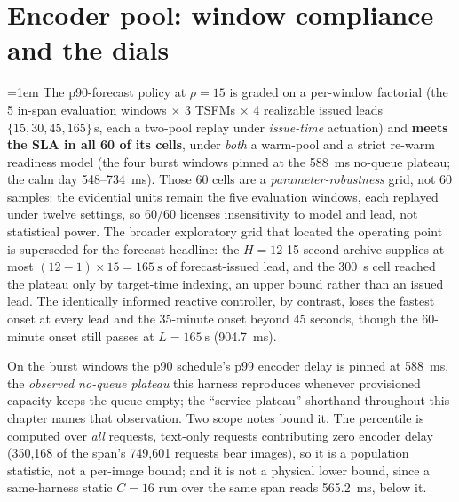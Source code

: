 \section{Encoder pool: window compliance and the dials}
\label{sec:cl-matrix}

{\emergencystretch=1em
The p90-forecast policy at $\rho{=}15$ is graded on a per-window factorial
(the 5 in-span evaluation windows $\times$ 3 TSFMs $\times$ 4 realizable issued
leads $\{15,30,45,165\}$\,s, each a two-pool replay under \emph{issue-time}
actuation) and \textbf{meets the SLA in all 60 of its cells}, under
\emph{both} a warm-pool and a strict re-warm readiness model (the four burst
windows pinned at the \SI{588}{\milli\second} no-queue plateau; the calm day
548--\SI{734}{\milli\second}). Those 60 cells are a
\emph{parameter-robustness} grid, not 60 samples: the evidential units remain
the five evaluation windows, each replayed under twelve settings, so 60/60 licenses
insensitivity to model and lead, not statistical power. The broader exploratory
grid that located the operating point is superseded for the forecast headline:
the $H{=}12$ 15-second archive supplies at most $(12{-}1)\times15 =
\SI{165}{\second}$ of forecast-issued lead, and the \SI{300}{\second} cell
reached the plateau only by target-time indexing, an upper bound rather than
an issued lead. The identically informed reactive controller, by contrast,
loses the fastest onset at every lead and the 35-minute onset beyond 45
seconds, though the 60-minute onset still passes at $L{=}\SI{165}{\second}$
(\SI{904.7}{\milli\second}).\par}

On the burst windows the p90 schedule's p99 encoder delay is pinned at
\SI{588}{\milli\second}, the \emph{observed no-queue plateau} this harness
reproduces whenever provisioned capacity keeps the queue empty; the ``service
plateau'' shorthand throughout this chapter names that observation. Two scope
notes bound it. The percentile is computed over \emph{all}
requests, text-only requests contributing zero encoder delay (350{,}168 of the
span's 749{,}601 requests bear images), so it is a population statistic, not a
per-image bound; and it is not a physical lower bound, since a same-harness
static $C{=}16$ run over the same span reads \SI{565.2}{\milli\second}, below it.


